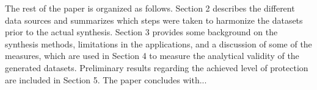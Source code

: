 The rest of the paper is organized as follows. Section 2 describes the different data sources and summarizes which steps were taken to harmonize the datasets prior to the actual synthesis. Section 3 provides some background on the synthesis methods, limitations in the applications, and a discussion of some of the measures, which are used in Section 4 to measure the analytical validity of the generated datasets. Preliminary results regarding the achieved level of protection are included in Section 5. The paper concludes with...
